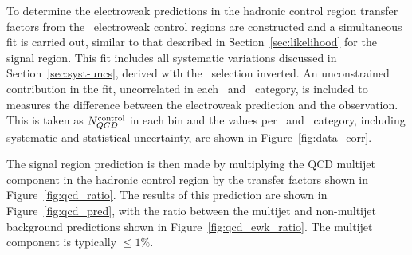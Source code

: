 To determine the electroweak predictions in the hadronic control region transfer factors 
from the \mhtmet~electroweak control regions are constructed and a simultaneous
fit is carried out, similar to that described in Section~\ref{sec:likelihood} for the signal region. 
This fit includes all systematic variations discussed in Section~\ref{sec:syst-uncs}, 
derived with the \mhtmet~selection inverted. An unconstrained contribution in the fit, 
uncorrelated in each \njet~and \scalht~category, is included to measures the difference between 
the electroweak prediction and the observation. This is taken as $N_{QCD}^{\rm control}$ in each bin and
the values per \njet~and \scalht~category, including systematic and statistical uncertainty,
are shown in Figure~\ref{fig:data_corr}. 

The signal region prediction is then made by multiplying the QCD multijet component in the hadronic 
control region by the transfer factors shown in Figure~\ref{fig:qcd_ratio}. The results of this prediction
are shown in Figure~\ref{fig:qcd_pred}, with the ratio between the multijet and non-multijet background
predictions shown in Figure~\ref{fig:qcd_ewk_ratio}. The multijet component is typically $\le 1\%$. 

